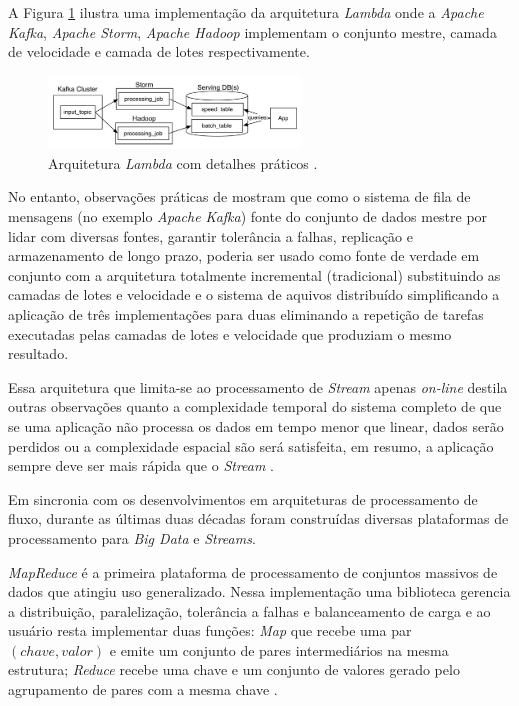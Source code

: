 A Figura \ref{lambda} ilustra uma implementação da arquitetura \emph{Lambda}
onde a \emph{Apache Kafka}, \emph{Apache Storm}, \emph{Apache Hadoop}
implementam o conjunto mestre, camada de velocidade e camada de lotes
respectivamente.

\begin{figure}[ht]
\centering
\includegraphics[width=0.6\textwidth]{figuras/lambda.png}
\caption{Arquitetura \emph{Lambda} com detalhes práticos \cite{Kreps2014}.}
\label{lambda}
\end{figure}

No entanto, observações práticas de  mostram que como o
sistema de fila de mensagens (no exemplo \emph{Apache Kafka}) fonte do conjunto
de dados mestre por lidar com diversas fontes, garantir tolerância a falhas,
replicação e armazenamento de longo prazo, poderia ser usado como fonte de
verdade em conjunto com a arquitetura totalmente incremental (tradicional)
substituindo as camadas de lotes e velocidade e o sistema de aquivos distribuído
simplificando a aplicação de três implementações para duas eliminando a
repetição de tarefas executadas pelas camadas de lotes e velocidade que
produziam o mesmo resultado.

Essa arquitetura que limita-se ao processamento de \emph{Stream} apenas
\emph{on-line} destila outras observações quanto a complexidade temporal do
sistema completo de que se uma aplicação não processa os dados em tempo menor
que linear, dados serão perdidos ou a complexidade espacial são será satisfeita,
em resumo, a aplicação sempre deve ser mais rápida que o \emph{Stream}
\cite{marz2015big}.


Em sincronia com os desenvolvimentos em arquiteturas de processamento de fluxo,
durante as últimas duas décadas foram construídas diversas plataformas de
processamento para \emph{Big Data} e \emph{Streams}.

\emph{MapReduce} é a primeira plataforma de processamento de conjuntos massivos
de dados que atingiu uso generalizado. Nessa implementação uma biblioteca
gerencia a distribuição, paralelização, tolerância a falhas e balanceamento de
carga e ao usuário resta implementar duas funções: \emph{Map} que recebe uma par
$(chave, valor)$ e emite um conjunto de pares intermediários na mesma estrutura;
\emph{Reduce} recebe uma chave e um conjunto de valores gerado pelo agrupamento
de pares com a mesma chave \cite{Dean2004}.

